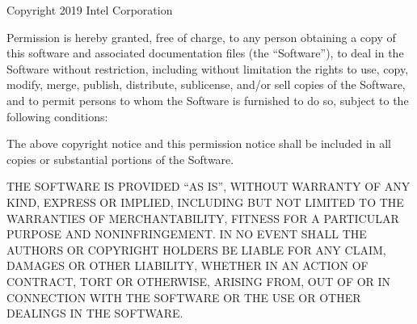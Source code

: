 \documentclass[letterpaper,10pt,english]{sphinxmanual}
\begin{document}
Copyright 2019 Intel Corporation

Permission is hereby granted, free of charge, to any person obtaining a
copy of this software and associated documentation files (the
“Software”), to deal in the Software without restriction, including
without limitation the rights to use, copy, modify, merge, publish,
distribute, sublicense, and/or sell copies of the Software, and to
permit persons to whom the Software is furnished to do so, subject to
the following conditions:

The above copyright notice and this permission notice shall be included
in all copies or substantial portions of the Software.

THE SOFTWARE IS PROVIDED “AS IS”, WITHOUT WARRANTY OF ANY KIND, EXPRESS
OR IMPLIED, INCLUDING BUT NOT LIMITED TO THE WARRANTIES OF
MERCHANTABILITY, FITNESS FOR A PARTICULAR PURPOSE AND NONINFRINGEMENT.
IN NO EVENT SHALL THE AUTHORS OR COPYRIGHT HOLDERS BE LIABLE FOR ANY
CLAIM, DAMAGES OR OTHER LIABILITY, WHETHER IN AN ACTION OF CONTRACT,
TORT OR OTHERWISE, ARISING FROM, OUT OF OR IN CONNECTION WITH THE
SOFTWARE OR THE USE OR OTHER DEALINGS IN THE SOFTWARE.



\renewcommand{\indexname}{Index}
\printindex
\end{document}
